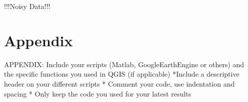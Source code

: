 \documentclass[11pt]{article}
\begin{document}
	
	!!!Noisy Data!!!
	
	\section{Appendix}
	APPENDIX: Include your scripts (Matlab, GoogleEarthEngine or others) and the specific functions you used in QGIS (if applicable)
	*Include a descriptive header on your different scripts
	* Comment your code, use indentation and spacing
	* Only keep the code you used for your latest results
	
	
	
	 
	
	
\end{document}
